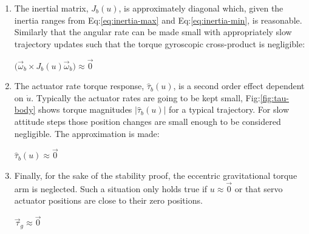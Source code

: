 \begin{enumerate}[itemsep=0em]
\item The inertial matrix, $J_b(u)$, is approximately diagonal which, given the inertia ranges from Eq:\ref{eq:inertia-max} and Eq:\ref{eq:inertia-min}, is reasonable. Similarly that the angular rate can be made small with appropriately slow trajectory updates such that the torque gyroscopic cross-product is negligible:
\begin{center}
\vspace{-10pt}
$\big(\vec{\omega}_b\times J_b(u)\vec{\omega}_b\big)\approx\vec{0}$
\vspace{-8pt}
\end{center}
\item The actuator rate torque response, $\hat{\tau}_b(u)$, is a second order effect dependent on $\dot{u}$. Typically the actuator rates are going to be kept small, Fig:\ref{fig:tau-body} shows torque magnitudes $|\hat{\tau}_b(u)|$ for a typical trajectory. For slow attitude steps those position changes are small enough to be considered negligible. The approximation is made:
\begin{center}
\vspace{-10pt}
$\hat{\tau}_b(u)\approx\vec{0}$
\vspace{-8pt}
\end{center}
\item Finally, for the sake of the stability proof, the eccentric gravitational torque arm is neglected. Such a situation only holds true if $u\approx\vec{0}$ or that servo actuator positions are close to their zero positions.
\begin{center}
\vspace{-10pt}
$\vec{\tau}_g\approx\vec{0}$
\vspace{-8pt}
\end{center}
\end{enumerate}
